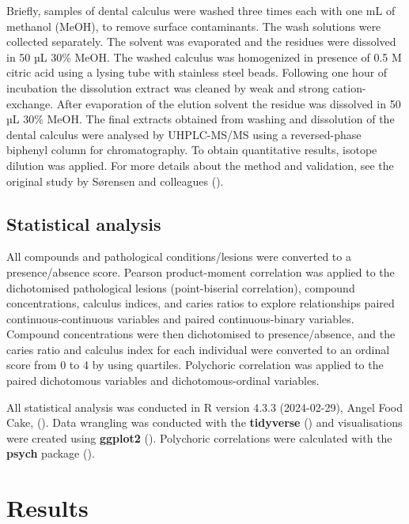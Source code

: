 \documentclass[
  b5paper,
]{book}
\begin{document}
Briefly, samples of dental calculus were washed three times each with
one mL of methanol (MeOH), to remove surface contaminants. The wash
solutions were collected separately. The solvent was evaporated and the
residues were dissolved in 50 µL 30\% MeOH. The washed calculus was
homogenized in presence of 0.5 M citric acid using a lysing tube with
stainless steel beads. Following one hour of incubation the dissolution
extract was cleaned by weak and strong cation-exchange. After
evaporation of the elution solvent the residue was dissolved in 50 µL
30\% MeOH. The final extracts obtained from washing and dissolution of
the dental calculus were analysed by UHPLC-MS/MS using a reversed-phase
biphenyl column for chromatography. To obtain quantitative results,
isotope dilution was applied. For more details about the method and
validation, see the original study by Sørensen and colleagues
().

\subsection{Statistical analysis}\label{statistical-analysis-1}

All compounds and pathological conditions/lesions were converted to a
presence/absence score. Pearson product-moment correlation was applied
to the dichotomised pathological lesions (point-biserial correlation),
compound concentrations, calculus indices, and caries ratios to explore
relationships paired continuous-continuous variables and paired
continuous-binary variables. Compound concentrations were then
dichotomised to presence/absence, and the caries ratio and calculus
index for each individual were converted to an ordinal score from 0 to 4
by using quartiles. Polychoric correlation was applied to the paired
dichotomous variables and dichotomous-ordinal variables.

All statistical analysis was conducted in R version 4.3.3 (2024-02-29),
Angel Food Cake, (). Data
wrangling was conducted with the \textbf{tidyverse}
() and visualisations
were created using \textbf{ggplot2} (). Polychoric correlations were calculated with the \textbf{psych}
package ().

\section{Results}\label{results-2}
\end{document}
